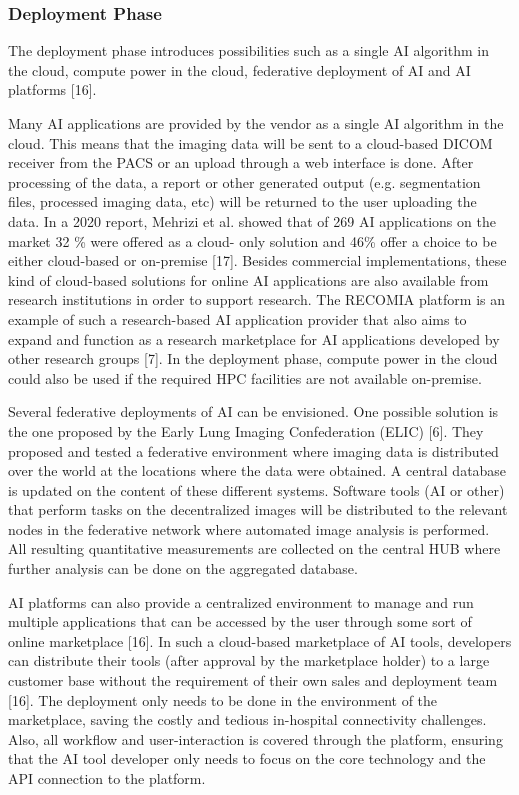 \subsubsection{Deployment Phase} The deployment phase introduces possibilities such as a single AI algorithm in the cloud, compute power in the cloud, federative deployment of AI and AI platforms [16].

Many AI applications are provided by the vendor as a single AI algorithm in the cloud. This means that the imaging data will be sent to a cloud-based DICOM receiver from the PACS or an upload through a web interface is done. After processing of the data, a report or other generated output (e.g. segmentation files, processed imaging data, etc) will be returned to the user uploading the data. In a 2020 report, Mehrizi et al. showed that of 269 AI applications on the market 32 \% were offered as a cloud- only solution and 46\% offer a choice to be either cloud-based or on-premise [17]. Besides commercial implementations, these kind of cloud-based solutions for online AI applications are also available from research institutions in order to support research. The RECOMIA platform is an example of such a research-based AI application provider that also aims to expand and function as a research marketplace for AI applications developed by other research groups [7]. In the deployment phase, compute power in the cloud could also be used if the required HPC facilities are not available on-premise.


Several federative deployments of AI can be envisioned. One possible solution is the one proposed by the Early Lung Imaging Confederation (ELIC) [6]. They proposed and tested a federative environment where imaging data is distributed over the world at the locations where the data were obtained. A central database is updated on the content of these different systems. Software tools (AI or other) that perform tasks on the decentralized images will be distributed to the relevant nodes in the federative network where automated image analysis is performed. All resulting quantitative measurements are collected on the central HUB where further analysis can be done on the aggregated database.


AI platforms can also provide a centralized environment to manage and run multiple applications that can be accessed by the user through some sort of online marketplace [16]. In such a cloud-based marketplace of AI tools, developers can distribute their tools (after approval by the marketplace holder) to a large customer base without the requirement of their own sales and deployment team [16]. The deployment only needs to be done in the environment of the marketplace, saving the costly and tedious in-hospital connectivity challenges. Also, all workflow and user-interaction is covered through the platform, ensuring that the AI tool developer only needs to focus on the core technology and the API connection to the platform. 


